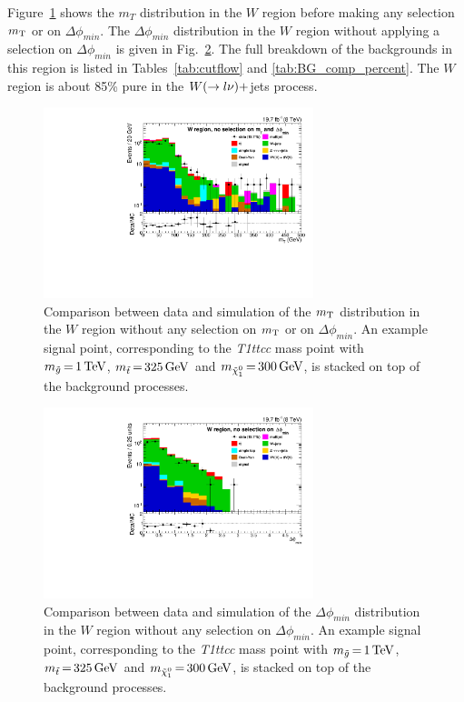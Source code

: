 Figure~\ref{fig:boost_W_region_mT} shows the $m_T$ distribution in the $W$ region before making any
selection $m_{\mathrm{T}}$ or on $\Delta\phi_{min}$. The $\Delta\phi_{min}$ distribution in the $W$ region
without applying a selection on $\Delta\phi_{min}$ is given in
Fig.~\ref{fig:boost_W_region_mindeltaphi}. The full breakdown of the backgrounds in this region is
listed in Tables~\ref{tab:cutflow} and \ref{tab:BG_comp_percent}. The $W$ region is about 85\% pure
in the $W(\rightarrow l\nu)+$jets process. 

\begin{figure}[htbp]
\centering
\includegraphics[width=0.7\textwidth]{figures/razor_selection/plots/DataMC_mT_0Lbg1Y1Ll_rebin}
\caption{Comparison between data and simulation of the $m_{\mathrm{T}}$ distribution in the $W$ region without
any selection on $m_{\mathrm{T}}$ or on $\Delta\phi_{min}$. An example signal
point, corresponding to the {\it T1ttcc} mass point with $m_{\tilde{g}} \,{=}\, 1\,\text{Te\hspace{-.08em}V}$,
$m_{\tilde{t}} \,{=}\, 325\,\text{Ge\hspace{-.08em}V}$ and $m_{\tilde{\chi}_1^0} \,{=}\, 300\,\text{Ge\hspace{-.08em}V}$, is stacked on top of
the
background processes.
\label{fig:boost_W_region_mT}}
\end{figure}

\begin{figure}[htbp]
\centering
\includegraphics[width=0.7\textwidth]
{figures/razor_selection/plots/DataMC_minDeltaPhi_0Lbg1Y1LlmT_rebin}
\caption{Comparison between data and simulation of the $\Delta\phi_{min}$ distribution in the $W$
region without any selection on $\Delta\phi_{min}$. An example signal
point, corresponding to the {\it T1ttcc} mass point with $m_{\tilde{g}} \,{=}\, 1\,\text{Te\hspace{-.08em}V}$,
$m_{\tilde{t}} \,{=}\, 325\,\text{Ge\hspace{-.08em}V}$ and $m_{\tilde{\chi}_1^0} \,{=}\, 300\,\text{Ge\hspace{-.08em}V}$, is stacked on top of
the
background processes.
\label{fig:boost_W_region_mindeltaphi}}
\end{figure}

